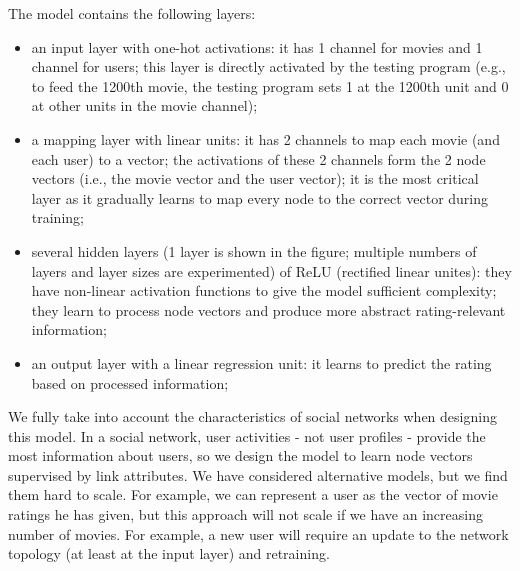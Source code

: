 \documentclass[twocolumn]{article}
\begin{document}
The model contains the following layers:
\begin{itemize}
	\item an input layer with one-hot activations: it has 1 channel for movies 
	and 1 channel for users;
	this layer is directly activated by the testing program (e.g., to feed the 
	1200th movie, the testing program sets 1 at the 1200th unit and 0 at other 	
	units in the movie channel);
	\item a mapping layer with linear units: it has 2 channels to map each 
	movie (and each user) to a vector;
	the activations of these 2 channels form the 2 node vectors (i.e., the 
	movie vector and the user vector);
	it is the most critical layer as it gradually learns to map every node to 
	the correct vector during training;
	\item several hidden layers (1 layer is shown in the figure; multiple 
	numbers of layers and layer sizes are experimented) of ReLU 
	(rectified linear unites):
	they have non-linear activation functions to give the model sufficient 
	complexity; 
	they learn to process node vectors and produce more abstract 
	rating-relevant information;
	\item an output layer with a linear regression unit: it learns to predict 
	the rating based on processed information;
\end{itemize}
We fully take into account the characteristics of social networks when 
designing this model.
In a social network, user activities - not user profiles - provide the most 
information about users, so we design the model to learn node vectors 
supervised by link attributes.
We have considered alternative models, but we find them hard to scale.
For example, we can represent a user as the vector of movie ratings he has 
given, 
but this approach will not scale if we have an increasing number of movies.
For example, a new user will require an update to the network topology (at 
least at the input layer) and retraining.
\end{document}
